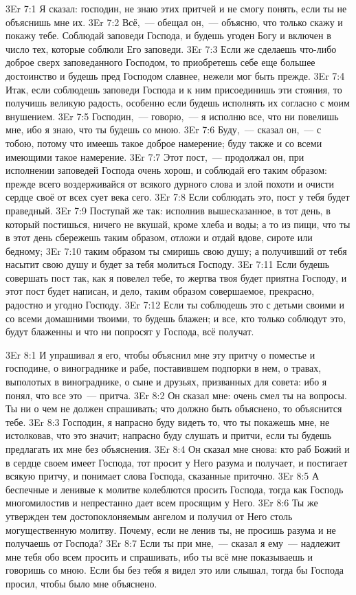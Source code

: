 \vs 3Er 7:1
Я сказал: господин, не
знаю этих притчей и не смогу понять, если ты не объяснишь мне их.
\vs 3Er 7:2
Всё,~--- обещал он,~--- объясню, что только скажу и покажу тебе. Соблюдай заповеди Господа, и будешь
угоден Богу и включен в число тех, которые соблюли Его заповеди.
\vs 3Er 7:3
Если же сделаешь что-либо
доброе сверх заповеданного Господом, то приобретешь себе еще большее
достоинство и будешь пред Господом славнее, нежели мог быть прежде.
\vs 3Er 7:4
Итак, если соблюдешь
заповеди Господа и к ним присоединишь эти стояния, то получишь великую
радость, особенно если будешь исполнять их согласно с моим внушением.
\vs 3Er 7:5
Господин,~--- говорю,~--- я
исполню все, что ни повелишь мне, ибо я знаю, что ты будешь со мною.
\vs 3Er 7:6
Буду,~--- сказал он,~--- с
тобою, потому что имеешь такое доброе намерение; буду также и со всеми
имеющими такое намерение.
\vs 3Er 7:7
Этот пост,~--- продолжал он,
при исполнении заповедей Господа очень хорош, и соблюдай его таким образом:
прежде всего воздерживайся от всякого дурного слова и злой похоти и очисти
сердце своё от всех сует века сего.
\vs 3Er 7:8
Если соблюдать это, пост у
тебя будет праведный.
\vs 3Er 7:9
Поступай же так: исполнив
вышесказанное, в тот день, в который постишься, ничего не вкушай, кроме хлеба
и воды; а то из пищи, что ты в этот день сбережешь таким образом, отложи и
отдай вдове, сироте или бедному;
\vs 3Er 7:10
таким образом ты смиришь
свою душу; а получивший от тебя насытит свою душу и будет за тебя молиться
Господу.
\vs 3Er 7:11
Если будешь совершать
пост так, как я повелел тебе, то жертва твоя будет приятна Господу, и этот
пост будет написан, и дело, таким образом совершаемое, прекрасно, радостно и
угодно Господу.
\vs 3Er 7:12
Если ты соблюдешь это с
детьми своими и со всеми домашними твоими, то будешь блажен; и все, кто только
соблюдут это, будут блаженны и что ни попросят у Господа, всё получат.

\vs 3Er 8:1
И упрашивал я его, чтобы
объяснил мне эту притчу о поместье и господине, о винограднике и рабе,
поставившем подпорки в нем, о травах, выполотых в винограднике, о сыне и
друзьях, призванных для совета: ибо я понял, что все это~--- притча.
\vs 3Er 8:2
Он сказал мне: очень смел
ты на вопросы. Ты ни о чем не должен спрашивать; что должно быть объяснено, то
объяснится тебе.
\vs 3Er 8:3
Господин, я напрасно буду
видеть то, что ты покажешь мне, не истолковав, что это значит; напрасно буду
слушать и притчи, если ты будешь предлагать их мне без объяснения.
\vs 3Er 8:4
Он сказал мне снова: кто
раб Божий и в сердце своем имеет Господа, тот просит у Него разума и получает,
и постигает всякую притчу, и понимает слова Господа, сказанные приточно.
\vs 3Er 8:5
А беспечные и ленивые к
молитве колеблются просить Господа, тогда как Господь многомилостив и
непрестанно дает всем просящим у Него.
\vs 3Er 8:6
Ты же утвержден тем
достопоклоняемым ангелом и получил от Него столь могущественную молитву.
Почему, если не ленив ты, не просишь разума и не получаешь от Господа?
\vs 3Er 8:7
Если ты при мне,~--- сказал
я ему~--- надлежит мне тебя обо всем просить и спрашивать, ибо ты всё мне
показываешь и говоришь со мною. Если бы без тебя я видел это или слышал, тогда
бы Господа просил, чтобы было мне объяснено.

